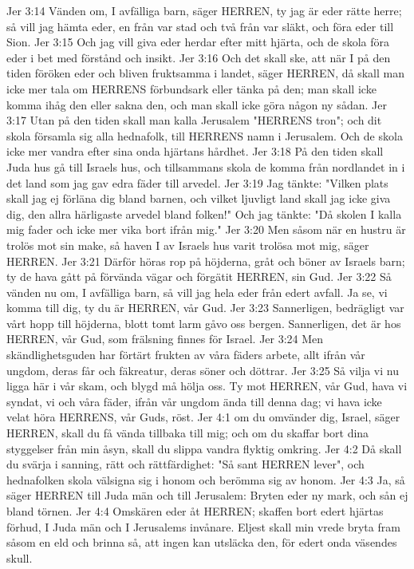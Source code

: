 Jer 3:14  Vänden om, I avfälliga barn, säger HERREN, ty jag är eder rätte herre; så vill jag hämta eder, en från var stad och två från var släkt, och föra eder till Sion.
Jer 3:15  Och jag vill giva eder herdar efter mitt hjärta, och de skola föra eder i bet med förstånd och insikt.
Jer 3:16  Och det skall ske, att när I på den tiden föröken eder och bliven fruktsamma i landet, säger HERREN, då skall man icke mer tala om HERRENS förbundsark eller tänka på den; man skall icke komma ihåg den eller sakna den, och man skall icke göra någon ny sådan.
Jer 3:17  Utan på den tiden skall man kalla Jerusalem "HERRENS tron"; och dit skola församla sig alla hednafolk, till HERRENS namn i Jerusalem. Och de skola icke mer vandra efter sina onda hjärtans hårdhet.
Jer 3:18  På den tiden skall Juda hus gå till Israels hus, och tillsammans skola de komma från nordlandet in i det land som jag gav edra fäder till arvedel.
Jer 3:19  Jag tänkte: "Vilken plats skall jag ej förläna dig bland barnen, och vilket ljuvligt land skall jag icke giva dig, den allra härligaste arvedel bland folken!" Och jag tänkte: "Då skolen I kalla mig fader och icke mer vika bort ifrån mig."
Jer 3:20  Men såsom när en hustru är trolös mot sin make, så haven I av Israels hus varit trolösa mot mig, säger HERREN.
Jer 3:21  Därför höras rop på höjderna, gråt och böner av Israels barn; ty de hava gått på förvända vägar och förgätit HERREN, sin Gud.
Jer 3:22  Så vänden nu om, I avfälliga barn, så vill jag hela eder från edert avfall. Ja se, vi komma till dig, ty du är HERREN, vår Gud.
Jer 3:23  Sannerligen, bedrägligt var vårt hopp till höjderna, blott tomt larm gåvo oss bergen. Sannerligen, det är hos HERREN, vår Gud, som frälsning finnes för Israel.
Jer 3:24  Men skändlighetsguden har förtärt frukten av våra fäders arbete, allt ifrån vår ungdom, deras får och fäkreatur, deras söner och döttrar.
Jer 3:25  Så vilja vi nu ligga här i vår skam, och blygd må hölja oss. Ty mot HERREN, vår Gud, hava vi syndat, vi och våra fäder, ifrån vår ungdom ända till denna dag; vi hava icke velat höra HERRENS, vår Guds, röst.
Jer 4:1  om du omvänder dig, Israel, säger HERREN, skall du få vända tillbaka till mig; och om du skaffar bort dina styggelser från min åsyn, skall du slippa vandra flyktig omkring.
Jer 4:2  Då skall du svärja i sanning, rätt och rättfärdighet: "Så sant HERREN lever", och hednafolken skola välsigna sig i honom och berömma sig av honom.
Jer 4:3  Ja, så säger HERREN till Juda män och till Jerusalem: Bryten eder ny mark, och sån ej bland törnen.
Jer 4:4  Omskären eder åt HERREN; skaffen bort edert hjärtas förhud, I Juda män och I Jerusalems invånare. Eljest skall min vrede bryta fram såsom en eld och brinna så, att ingen kan utsläcka den, för edert onda väsendes skull.
